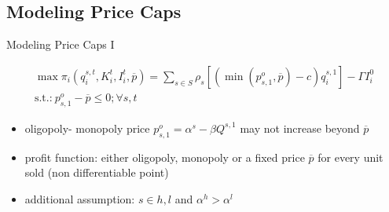 \subsection{Modeling Price Caps}

\begin{frame}{Modeling Price Caps I}

\begin{gather}
	\max \pi_i(q_{i}^{s,t},K_{i}^t,I_{i}^t, \overline{p})= \label{eq:pcmax1}
	\sum_{s\in S} \rho_s \left[ ( \min{(p_{s,1}^{o},\overline{p})} - c) q_{i}^{s,1}  \right] - \Gamma I_{i}^{0}  \\
			\text{s.t.:} \  p_{s,1}^{o} - \overline{p} \leq 0; \forall s,t \label{eq:pcconstraint}
\end{gather}

\begin{itemize}
	\item oligopoly- monopoly price $p_{s,1}^{o}= \alpha^s - \beta Q^{s,1}$ may not increase beyond $\overline{p}$
	\item profit function: either oligopoly, monopoly or a fixed price $\overline{p}$ for every unit sold (non differentiable point)
	\item additional assumption: $s \in h,l$ and $\alpha^h > \alpha^l$
\end{itemize}

\end{frame}






